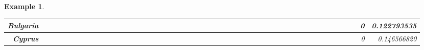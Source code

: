 \documentclass[a4paper,11pt]{report}
\newtheorem{example}[theorem]{Example}
\begin{document}
\begin{example}
\begin{appendices}
\begin{landscape}
\begin{longtable}{r|r|r|r|r|r|r|r|r|r|r|r|r|r|r|r|r|r|r|r|r|r|r|r|r|r|r|r|r|r|r|r|r|r|r|r|r|r|r|r|r|r|r|r|r|r|r|}
\multicolumn{1}{|r|}{\textbf{Bulgaria}}              &                  &                  &                  &                     &                  &                  &                                &                   &                  &                 &                         &                  &                  &                           &                  &                 &                  &                 &                  &                  &                  &                 &                 &                    &                &                  &                     &                 &                 &                   &                  &                 &                 &                   &                   &                &                 &                      &                          &                 &                  &                         &                 &                & 0                        & 0.122793535        \\ \hline
\multicolumn{1}{|r|}{\textbf{Cyprus}}                &                  &                  &                  &                     &                  &                  &                                &                   &                  &                 &                         &                  &                  &                           &                  &                 &                  &                 &                  &                  &                  &                 &                 &                    &                &                  &                     &                 &                 &                   &                  &                 &                 &                   &                   &                &                 &                      &                          &                 &                  &                         &                 &                & 0                        & 0.146566820        \\ \hline

\end{longtable}
\end{landscape}
\end{appendices}
\end{example}
\end{document}
